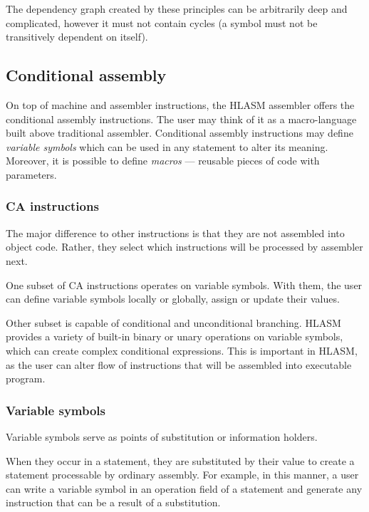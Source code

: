 The dependency graph created by these principles can be arbitrarily deep and complicated, however it must not contain cycles (a symbol must not be transitively dependent on itself).

\subsection{Conditional assembly}
\label{CA_proc}

On top of machine and assembler instructions, the HLASM assembler offers the conditional assembly instructions. The user may think of it as a macro-language built above traditional assembler. Conditional assembly instructions may define \emph{variable symbols} which can be used in any statement to alter its meaning. Moreover, it is possible to define \emph{macros} --- reusable pieces of code with parameters.

\subsubsection{CA instructions}

The major difference to other instructions is that they are not assembled into object code. Rather, they select which instructions will be processed by assembler next.

One subset of CA instructions operates on variable symbols. With them, the user can define variable symbols locally or globally, assign or update their values.

Other subset is capable of conditional and unconditional branching. HLASM provides a variety of built-in binary or unary operations on variable symbols, which can create complex conditional expressions. This is important in HLASM, as the user can alter flow of instructions that will be assembled into executable program.

\subsubsection{Variable symbols}

Variable symbols serve as points of substitution or information holders. 

When they occur in a statement, they are substituted by their value to create a statement processable by ordinary assembly. For example, in this manner, a user can write a variable symbol in an operation field of a statement and generate any instruction that can be a result of a substitution.

